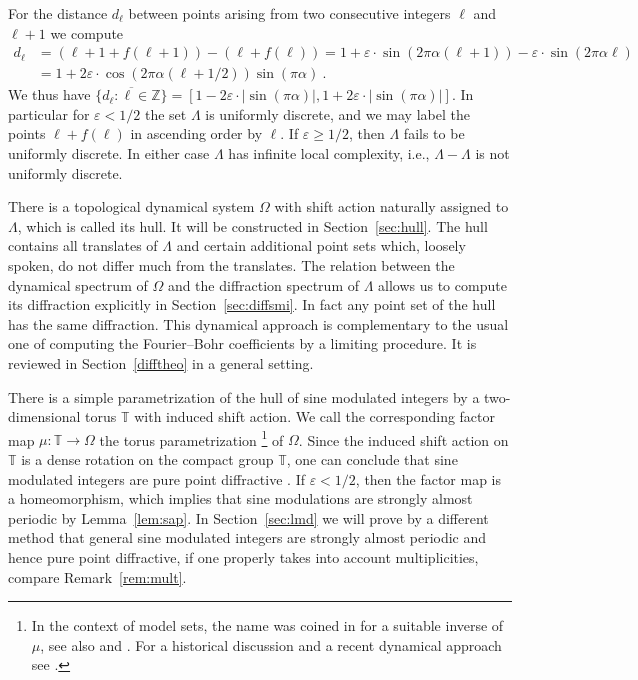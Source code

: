 \documentclass[11pt, a4wide]{amsart}
\numberwithin{lemma}{section}
\begin{document}
\medskip

For the distance $d_\ell$  between points arising from two consecutive integers $\ell$ and $\ell+1$ we compute
%
\begin{displaymath}
\begin{split}
d_\ell&= (\ell+1+f(\ell+1))-(\ell+f(\ell))=
1+\varepsilon\cdot \sin(2\pi\alpha(\ell+1))-\varepsilon\cdot \sin(2\pi\alpha \ell)\\
&= 1+2\varepsilon\cdot \cos(2\pi\alpha(\ell+1/2))\sin(\pi\alpha) \ .
\end{split}
\end{displaymath}
%
We thus have $\overline{\{d_\ell: \ell\in \mathbb Z\}}=[1-2\varepsilon \cdot |\sin(\pi\alpha)|, 1+2\varepsilon \cdot |\sin(\pi\alpha)|]$. In particular for $\varepsilon <1/2$ the set $\Lambda$ is uniformly discrete, and we may label the points $\ell+f(\ell)$ in ascending order by $\ell$. If $\varepsilon\ge 1/2$, then $\Lambda$ fails to be uniformly discrete. In either case $\Lambda$ has infinite local complexity, i.e., $\Lambda-\Lambda$ is not uniformly discrete.

\smallskip

 There is a topological dynamical system $\Omega$ with shift action naturally assigned to $\Lambda$, which is called its hull. It will be constructed in Section~\ref{sec:hull}.
 The hull contains all translates of $\Lambda$ and certain additional point sets which, loosely spoken, do not differ much from the translates. 
 The relation between the dynamical spectrum of $\Omega$ and the diffraction spectrum of $\Lambda$ allows us to compute its diffraction explicitly in Section~\ref{sec:diffsmi}. In fact any point set of the hull has the same diffraction.
This dynamical approach is complementary to the usual one of computing the Fourier--Bohr coefficients by a limiting procedure. It is reviewed in Section~\ref{difftheo} in a general setting.
 
\smallskip

There is a simple parametrization of the hull of sine modulated integers by a two-dimensional torus $\mathbb T$ with induced shift action. We call the corresponding factor map $\mu:\mathbb T\to \Omega$ the torus parametrization%
%
\footnote{In the context of model sets, the name was coined in \cite{BHP} for a suitable inverse of $\mu$, see also \cite{Ro96} and \cite{Martin2}. For a historical discussion and a recent dynamical approach see \cite{KR,KR17}.} 
%
of $\Omega$. Since the induced shift action on $\mathbb T$ is a dense rotation on the compact group $\mathbb T$, one can conclude that sine modulated integers are pure point diffractive \cite[Sec.~3]{BL2}. 
If $\varepsilon<1/2$, then the factor map is a homeomorphism, which implies that sine modulations are strongly almost periodic by Lemma~\ref{lem:sap}. In Section~\ref{sec:lmd} we will prove by a different method that general sine modulated integers are strongly almost periodic and hence pure point diffractive, if one properly takes into account multiplicities, compare Remark~\ref{rem:mult}.
 
\end{document}
